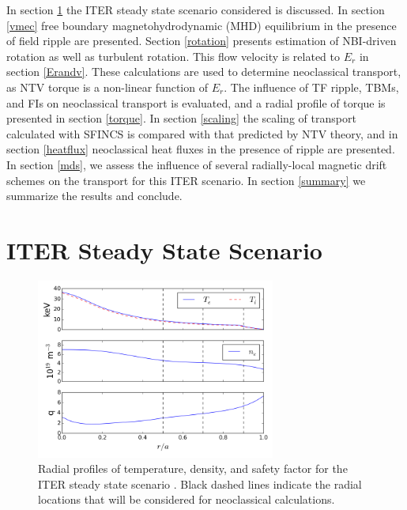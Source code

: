 \documentclass{article}
\numberwithin{figure}{section}
\numberwithin{equation}{section}
\begin{document}
In section \ref{steadystate} the ITER steady state scenario considered is discussed. In section \ref{vmec} free boundary magnetohydrodynamic (MHD) equilibrium in the presence of field ripple are presented. Section \ref{rotation} presents estimation of NBI-driven rotation as well as turbulent rotation. This flow velocity is related to $E_r$ in section \ref{Erandv}. These calculations are used to determine neoclassical transport, as NTV torque is a non-linear function of $E_r$. The influence of TF ripple, TBMs, and FIs on neoclassical transport is evaluated, and a radial profile of torque is presented in section \ref{torque}. In section \ref{scaling} the scaling of transport calculated with SFINCS is compared with that predicted by NTV theory, and in section \ref{heatflux} neoclassical heat fluxes in the presence of ripple are presented. In section \ref{mds}, we assess the influence of several radially-local magnetic drift schemes on the transport for this ITER scenario. In section \ref{summary} we summarize the results and conclude.

\section{ITER Steady State Scenario}\label{steadystate}

\FloatBarrier

\begin{figure}[h!]
\centering
\includegraphics[width=0.7\textwidth]{profiles.png}
\caption{\label{fig:profiles} Radial profiles of temperature, density, and safety factor for the ITER steady state scenario \cite{Poli2014}. Black dashed lines indicate the radial locations that will be considered for neoclassical calculations.}
\end{figure}
\end{document}
